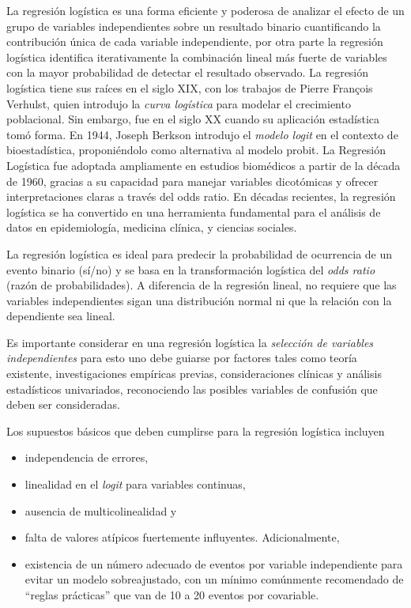 \documentclass[12pt]{article}
\begin{document}
La regresi\'on log\'istica es una forma eficiente y poderosa de analizar el efecto de un grupo de variables independientes sobre un resultado binario cuantificando la contribuci\'on \'unica de cada variable independiente, por otra parte la regresi\'on log\'istica identifica iterativamente la combinaci\'on lineal m\'as fuerte de variables con la mayor probabilidad de detectar el resultado observado. La regresi\'on log\'istica tiene sus ra\'ices en el siglo XIX, con los trabajos de Pierre François Verhulst, quien introdujo la \textit{curva log\'istica} para modelar el crecimiento poblacional. Sin embargo, fue en el siglo XX cuando su aplicaci\'on estad\'istica tom\'o forma. En 1944, Joseph Berkson introdujo el \textit{modelo logit} en el contexto de bioestad\'istica, proponi\'endolo como alternativa al modelo probit. La Regresi\'on Log\'istica fue adoptada ampliamente en estudios biom\'edicos a partir de la d\'ecada de 1960, gracias a su capacidad para manejar variables dicot\'omicas y ofrecer interpretaciones claras a trav\'es del odds ratio. En d\'ecadas recientes, la regresi\'on log\'istica se ha convertido en una herramienta fundamental para el an\'alisis de datos en epidemiolog\'ia, medicina cl\'inica, y ciencias sociales.


La regresi\'on log\'istica es ideal para predecir la probabilidad de ocurrencia de un evento binario (s\'i/no) y se basa en la transformaci\'on log\'istica del \textit{odds ratio} (raz\'on de probabilidades). A diferencia de la regresi\'on lineal, no requiere que las variables independientes sigan una distribuci\'on normal ni que la relaci\'on con la dependiente sea lineal.

Es importante considerar en una regresi\'on log\'istica la \textit{selecci\'on de variables independientes} para esto uno debe guiarse por factores tales como teor\'ia existente, investigaciones emp\'iricas previas, consideraciones cl\'inicas y an\'alisis estad\'isticos univariados, reconociendo las posibles variables de confusi\'on que deben ser consideradas. 

Los supuestos b\'asicos que deben cumplirse para la regresi\'on log\'istica incluyen
\begin{itemize}
\item independencia de errores, 
\item linealidad en el \textit{logit} para variables continuas, 
\item ausencia de multicolinealidad y 
\item falta de valores at\'ipicos fuertemente influyentes. Adicionalmente, 
\item existencia de un n\'umero adecuado de eventos por variable independiente para evitar un modelo sobreajustado, con un m\'inimo com\'unmente recomendado de “reglas pr\'acticas” que van de 10 a 20 eventos por covariable.
\end{itemize}
\end{document}

